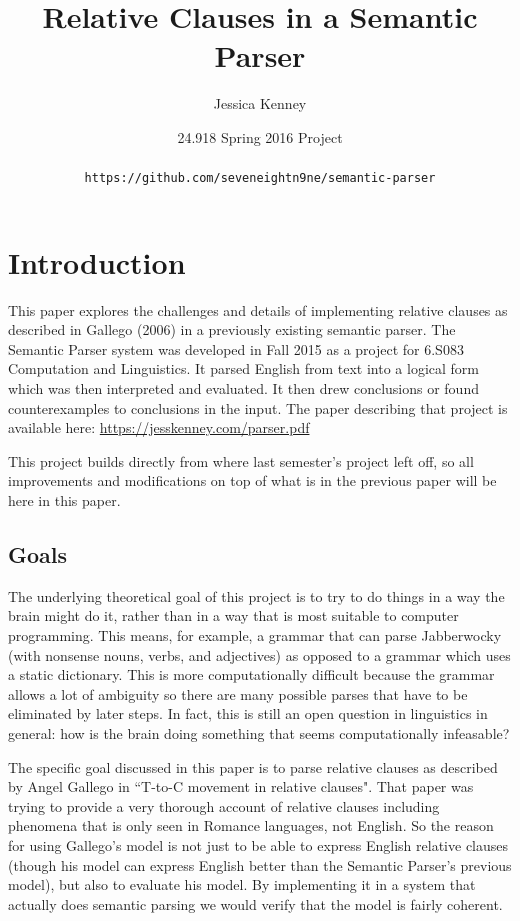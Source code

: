 \documentclass[11pt]{article}
\title{Relative Clauses in a Semantic Parser}
\author{Jessica Kenney}
\date{24.918 Spring 2016 Project\\\ \\
\texttt{https://github.com/seveneightn9ne/semantic-parser}}
\begin{document}
\maketitle
\tableofcontents

\section{Introduction}
This paper explores the challenges and details of implementing relative clauses as described in
Gallego (2006) in a previously existing semantic parser. The Semantic Parser system was developed
in Fall 2015 as a project for 6.S083 Computation and Linguistics.
It parsed English from text into a logical form which was then interpreted and evaluated. It then
drew conclusions or found counterexamples to conclusions in the input. The paper describing that
project is available here:
\url{https://jesskenney.com/parser.pdf}

This project builds directly from where last semester's project left off, so all improvements and
modifications on top of what is in the previous paper will be here in this paper.

\subsection{Goals}
The underlying theoretical goal of this project is to try to do things in a way the brain might do it,
 rather than in a way that is most suitable to computer programming. This means,
for example, a grammar that can parse Jabberwocky (with nonsense nouns, verbs, and adjectives) as
opposed to a grammar which uses a static dictionary. This is more computationally difficult because
the grammar allows a lot of ambiguity so there are many possible parses that have to be eliminated
by later steps. In fact, this is still an open question in linguistics in general: how is the brain
doing something that seems computationally infeasable?

The specific goal discussed in this paper is to parse relative clauses as described by Angel Gallego
in ``T-to-C movement in relative clauses". That paper was trying to provide a very thorough account
of relative clauses including phenomena that is only seen in Romance languages, not English. So the
reason for using Gallego's model is not just to be able to express English relative clauses (though
his model can express English better than the Semantic Parser's previous model), but also to evaluate
his model. By implementing it in a system that actually does semantic parsing we would verify that
the model is fairly coherent.
\end{document}
